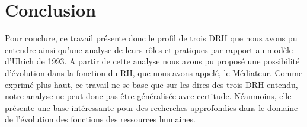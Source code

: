 \section*{Conclusion}

Pour conclure, ce travail présente donc le profil de trois DRH que nous avons pu entendre ainsi qu'une analyse de leurs rôles et pratiques par rapport au modèle d'Ulrich de 1993. A partir de cette analyse nous avons pu proposé une possibilité d'évolution dans la fonction du RH, que nous avons appelé, le \og{}Médiateur\fg{}.\newline
Comme exprimé plus haut, ce travail ne se base que sur les dires des trois DRH entendu, notre analyse ne peut donc pas être généralisée avec certitude. Néanmoins, elle présente une base intéressante pour des recherches approfondies dans le domaine de l'évolution des fonctions des ressources humaines.